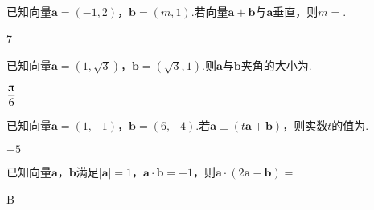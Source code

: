   \begin{exercise}
    \item %
      已知向量$\bm a=(-1,2)$，$\bm b=(m,1)$.若向量$\bm a+\bm b$与$\bm a$垂直，则$m=$\tk.
      \begin{answer}
        7
      \end{answer}
    \item %
      已知向量$\bm a=(1,\sqrt3)$，$\bm b=(\sqrt3,1)$.则$\bm a$与$\bm b$夹角的大小为\tk.
      \begin{answer}
        $\dfrac{\piup}6$
      \end{answer}
    \item %
      已知向量$\bm a=(1,-1)$，$\bm b=(6,-4)$.若$\bm a\perp (t\bm a+\bm b)$，则实数$t$的值为\tk.
      \begin{answer}
        $-5$
      \end{answer}
    \item %
      已知向量$\bm a$，$\bm b$满足$|\bm a|=1$，$\bm a\cdot\bm b=-1$，则$\bm a\cdot (2\bm a-\bm b)=$\xz
      \begin{answer}
        B
      \end{answer}
    \item %

\end{exercise}
